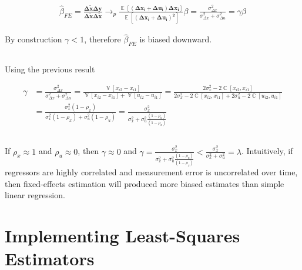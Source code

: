 \documentclass[12pt]{article}
\begin{document}
\begin{equation}
\begin{split}
\hat{\beta}_{FE} = \mathbf{\frac{\Delta\tilde{x}\Delta y}{\Delta\tilde{x}\Delta\tilde{x}}} \rightarrow_p \mathbf{\frac{\mathop{\mathbb{E}}[(\Delta x_i + \Delta u_i)\Delta x_i]}{\mathop{\mathbb{E}}[(\Delta x_i + \Delta u_i)^2]}}\beta = \frac{\sigma_{\Delta x}^2}{\sigma_{\Delta x}^2 + \sigma_{\Delta u}^2} = \gamma\beta
\end{split}
\end{equation}

By construction $\gamma<1$, therefore $\hat{\beta}_{FE}$ is biased downward.


\subsection{}

Using the previous result

\begin{equation}
\begin{split}
\gamma & = \frac{\sigma_{\Delta x}^2}{\sigma_{\Delta x}^2 + \sigma_{\Delta u}^2} =
\frac{\mathop{\mathbb{V}}[x_{i2} - x_{i1}]}{\mathop{\mathbb{V}}[x_{i2} - x_{i1}] + \mathop{\mathbb{V}}[u_{i2} - u_{i1}]} = \frac{2\sigma_x^2 -2 \mathop{\mathbb{C}}[x_{i2},x_{i1}]}{2\sigma_x^2 -2  \mathop{\mathbb{C}}[x_{i2},x_{i1}] + 2\sigma_u^2 -2 \mathop{\mathbb{C}}[u_{i2},u_{i1}]} \\
& = \frac{\sigma_x^2(1-\rho_x)}{\sigma_x^2(1-\rho_x) + \sigma_u^2(1-\rho_u)} = \frac{\sigma_x^2}{\sigma_x^2 + \sigma_u^2\frac{(1-\rho_u)}{(1-\rho_x)}}
\end{split}
\end{equation}


\subsection{}
If $\rho_x \approx 1$ and $\rho_u \approx 0$, then $\gamma \approx 0$  and $\gamma = \frac{\sigma_x^2}{\sigma_x^2 + \sigma_u^2\frac{(1-\rho_u)}{(1-\rho_x)}} < \frac{\sigma_x^2}{\sigma_x^2 + \sigma_u^2} = \lambda $. Intuitively, if regressors are highly correlated and measurement error is uncorrelated over time, then fixed-effects estimation will produced more biased estimates than simple linear regression.


\section{Implementing Least-Squares Estimators}
\end{document}
